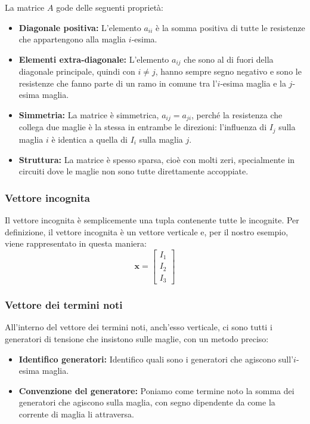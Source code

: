 La matrice $A$ gode delle seguenti proprietà:
\begin{itemize}
    \item \textbf{Diagonale positiva:} L'elemento $a_{ii}$ è la somma positiva di tutte le resistenze che appartengono alla maglia $i$-esima.
    \item \textbf{Elementi extra-diagonale:} L'elemento $a_{ij}$ che sono al di fuori della diagonale principale, quindi con $i \neq j$, hanno sempre segno negativo e sono le resistenze che fanno parte di un ramo in comune tra l'$i$-esima maglia e la $j$-esima maglia.
    \item \textbf{Simmetria:} La matrice è simmetrica, $a_{ij}=a_{ji}$, perché la resistenza che collega due maglie è la stessa in entrambe le direzioni: l'influenza di $I_j$ sulla maglia $i$ è identica a quella di $I_i$ sulla maglia $j$.
    \item \textbf{Struttura:} La matrice è spesso sparsa, cioè con molti zeri, specialmente in circuiti dove le maglie non sono tutte direttamente accoppiate.
\end{itemize}

\subsubsection*{Vettore incognita}

Il vettore incognita è semplicemente una tupla contenente tutte le incognite. Per definizione, il vettore incognita è un vettore verticale e, per il nostro esempio, viene rappresentato in questa maniera:
\begin{equation}
    \mathbf{x} =
    \begin{bmatrix}
        I_1 \\
        I_2 \\
        I_3
    \end{bmatrix}
\end{equation}

\subsubsection*{Vettore dei termini noti}

All'interno del vettore dei termini noti, anch'esso verticale, ci sono tutti i generatori di tensione che insistono sulle maglie, con un metodo preciso:
\begin{itemize}
    \item \textbf{Identifico generatori:} Identifico quali sono i generatori che agiscono sull'$i$-esima maglia.
    \item \textbf{Convenzione del generatore:} Poniamo come termine noto la somma dei generatori che agiscono sulla maglia, con segno dipendente da come la corrente di maglia li attraversa.
\end{itemize}

